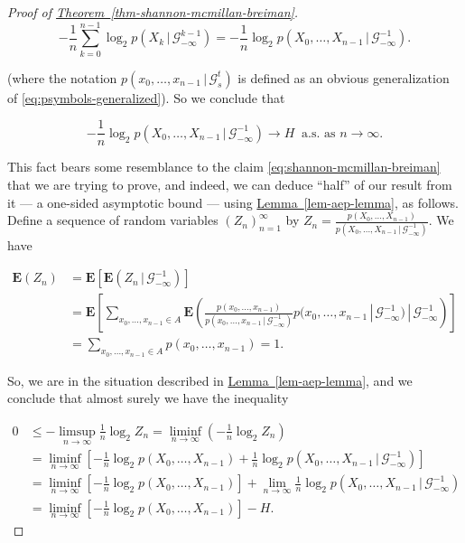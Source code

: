 \documentclass[11pt]{report}
\theoremstyle{plain}
\theoremstyle{definition}
\begin{document}
\begin{proof}[Proof of \texorpdfstring{\hyperref[thm-shannon-mcmillan-breiman]{Theorem~\ref*{thm-shannon-mcmillan-breiman}}}{Theorem}]
\begin{equation*} \tag{38}\label{eq:aep-ergodic-average1}
-\frac{1}{n} \sum_{k=0}^{n-1} \log_2 p(X_k\,|\,\mathcal{G}_{-\infty}^{k-1}) = -\frac{1}{n} \log_2 p(X_0,\ldots,X_{n-1}\,|\,\mathcal{G}_{-\infty}^{-1}).
\end{equation*}

\noindent (where the notation
$p(x_0,\ldots,x_{n-1}\,|\,\mathcal{G}_s^t)$ is
defined as an obvious generalization of
\eqref{eq:psymbols-generalized}). So we conclude that

\[
-\frac{1}{n} \log_2 p(X_0,\ldots,X_{n-1}\,|\,\mathcal{G}_{-\infty}^{-1})
\to H \ \textrm{ a.s. as }n\to\infty.
\]

\noindent This fact bears some resemblance to the claim
\eqref{eq:shannon-mcmillan-breiman} that we are trying to
prove, and indeed, we can deduce ``half'' of our
result from it --- a one-sided asymptotic bound ---
using \hyperref[lem-aep-lemma]{Lemma~\ref*{lem-aep-lemma}}, as follows. Define a
sequence of random variables $(Z_n)_{n=1}^\infty$ by
$Z_n =
\frac{p(X_0,\ldots,X_{n-1})}{p(X_0,\ldots,X_{n-1}\,|\,\mathcal{G}_{-\infty}^{-1})}$.
We have

\begin{align*}
\mathbf{E}(Z_n) &= \mathbf{E} \left[\mathbf{E}\left(Z_n\,|\,\mathcal{G}_{-\infty}^{-1}\right)\right] \\
&= \mathbf{E}\left[
\sum_{x_0,\ldots,x_{n-1}\in A}
\mathbf{E}\left(
\frac{p(x_0,\ldots,x_{n-1})}{p(x_0,\ldots,x_{n-1}\,|\,\mathcal{G}_{-\infty}^{-1})}
p(x_0,\ldots,x_{n-1}\,|\,\mathcal{G}_{-\infty}^{-1})
\,|\,\mathcal{G}_{-\infty}^{-1}\right)
\right] \\
&= \tag{39}\label{eq:aep-expec1} \sum_{x_0,\ldots,x_{n-1}\in A} p(x_0,\ldots,x_{n-1}) = 1.
\end{align*}

\noindent So, we are in the situation described in \texorpdfstring{\hyperref[lem-aep-lemma]{Lemma~\ref*{lem-aep-lemma}}}{Lemma}, and we conclude that almost surely we
have the inequality

\begin{align*}
0 &\le -\limsup_{n\to\infty} \frac{1}{n} \log_2 Z_n = \liminf_{n\to\infty} \left(-\frac{1}{n} \log_2 Z_n\right) \\
&= \liminf_{n\to\infty} \left[
-\frac{1}{n} \log_2 p(X_0,\ldots,X_{n-1}) + \frac{1}{n}\log_2 p(X_0,\ldots,X_{n-1}\,|\,\mathcal{G}_{-\infty}^{-1}) \right] \\
&=
\liminf_{n\to\infty} \left[-\frac{1}{n} \log_2 p(X_0,\ldots,X_{n-1})\right] +
\lim_{n\to\infty}
\frac{1}{n}\log_2 p(X_0,\ldots,X_{n-1}\,|\,\mathcal{G}_{-\infty}^{-1}) \\
&=
\liminf_{n\to\infty} \left[-\frac{1}{n} \log_2 p(X_0,\ldots,X_{n-1})\right] - H.
\end{align*}


\end{proof}
\end{document}
